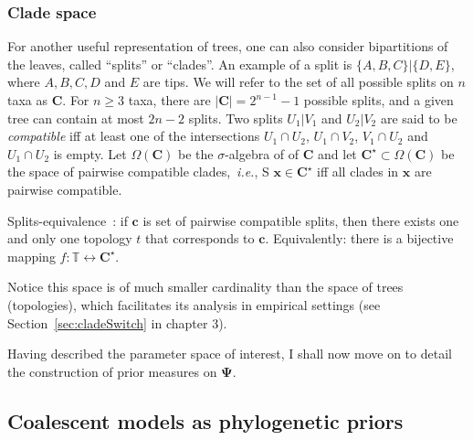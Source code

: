 \subsubsection{Clade space}

For another useful representation of trees, one can also consider bipartitions of the leaves, called ``splits'' or ``clades''. %
An example of a split is $\{A, B, C\} | \{ D, E\}$, where $A, B, C, D$ and $E$ are tips.
We will refer to the set of all possible splits on $n$ taxa as $\boldsymbol C$.
For $n \geq 3$ taxa, there are $|\boldsymbol C| = 2^{n-1}-1$ possible splits, and a given tree can contain at most $2n-2$ splits.
Two splits $U_1 | V_1$ and $U_2 | V_2$ are said to be \textit{compatible} iff at least one of the intersections $U_1 \cap U_2$, $U_1 \cap V_2$, $V_1 \cap U_2$ and $U_1 \cap U_2$ is empty.
Let $\Omega(\boldsymbol C)$ be the $\sigma$-algebra of of $\boldsymbol C$ and let $\boldsymbol C^\star \subset \Omega(\boldsymbol C)$ be  the space of pairwise compatible clades,~\textit{i.e.}, S $\boldsymbol x \in \boldsymbol C^\star$ iff all clades in $\boldsymbol x$ are pairwise compatible.
\begin{theorem}
\label{thm:splitstheorem}
 Splits-equivalence~\citep{Buneman1971}: if $\boldsymbol c$ is set of pairwise compatible splits, then there exists one and only one topology $t$ that corresponds to $\boldsymbol c$.
 Equivalently: there is a bijective mapping $f: \mathbb{T}  \leftrightarrow \boldsymbol C^\star$.
\end{theorem}
Notice this space is of much smaller cardinality than the space of trees (topologies), which facilitates its analysis in empirical settings (see Section~\ref{sec:cladeSwitch} in chapter 3).

Having described the parameter space of interest, I shall now move on to detail the construction of prior measures on $\boldsymbol\Psi$.

\subsection{Coalescent models as phylogenetic priors}
\label{sec:coalescent_priors}

